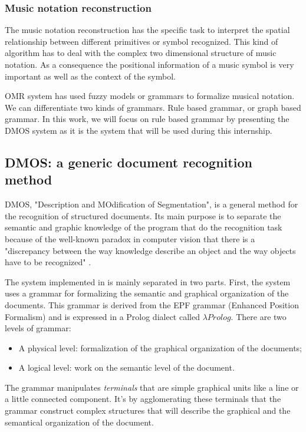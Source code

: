 \documentclass[11pt]{sdm}
\begin{document}
\subsubsection{Music notation reconstruction}

The music notation reconstruction has the specific task to interpret the spatial relationship between different primitives or symbol recognized.
This kind of algorithm has to deal with the complex two dimensional structure of music notation.
As a consequence the positional information of a music symbol is very important as well as the context of the symbol.

OMR system has used fuzzy models or grammars to formalize musical notation.
We can differentiate two kinds of grammars.
Rule based grammar, or graph based grammar.
In this work, we will focus on rule based grammar by presenting the DMOS system \cite{couasnon_dmos_2001} as it is the system that will be used during this internship.

\subsection{DMOS: a generic document recognition method}

DMOS, "Description and MOdification of Segmentation", is a general method for the recognition of structured documents.
Its main purpose is to separate the semantic and graphic knowledge of the program that do the recognition task because of the well-known paradox in computer vision that there is a "discrepancy between the way knowledge describe an object and the way objects have to be recognized" \cite{couasnon_dmos_2001}.

The system implemented in \cite{couasnon_dmos_2001} is mainly separated in two parts.
First, the system uses a grammar for formalizing the semantic and graphical organization of the documents.
This grammar is derived from the EPF grammar (Enhanced Position Formalism) and is expressed in a Prolog dialect called $\lambda Prolog$.
There are two levels of grammar:
\begin{itemize}
  \item A physical level: formalization of the graphical organization of the documents;
  \item A logical level: work on the semantic level of the document.
\end{itemize}
The grammar manipulates \textit{terminals} that are simple graphical units like a line or a little connected component.
It’s by agglomerating these terminals that the grammar construct complex structures that will describe the graphical and the semantical organization of the document.
\end{document}
